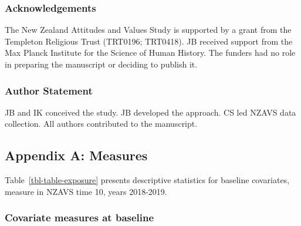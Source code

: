 \documentclass[
  single column]{article}
\begin{document}
\subsubsection{Acknowledgements}\label{acknowledgements}

The New Zealand Attitudes and Values Study is supported by a grant from
the Templeton Religious Trust (TRT0196; TRT0418). JB received support
from the Max Planck Institute for the Science of Human History. The
funders had no role in preparing the manuscript or deciding to publish
it.

\subsubsection{Author Statement}\label{author-statement}

JB and IK conceived the study. JB developed the approach. CS led NZAVS
data collection. All authors contributed to the manuscript.

\newpage{}

\subsection{Appendix A: Measures}\label{appendix-measures-a}

Table~\ref{tbl-table-exposure} presents descriptive statistics for
baseline covariates, measure in NZAVS time 10, years 2018-2019.

\subsubsection{Covariate measures at
baseline}\label{covariate-measures-at-baseline}
\end{document}
